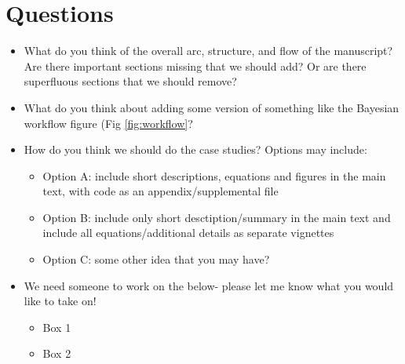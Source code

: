 \documentclass{article}
\begin{document}
\section* {Questions}
\begin{itemize}
\item What do you think of the overall arc, structure, and flow of the manuscript? Are there important sections missing that we should add? Or are there superfluous sections that we should remove?
\item What do you think about adding some version of something like the Bayesian workflow figure (Fig \ref{fig:workflow}? 
\item How do you think we should do the case studies? Options may include:
\begin {itemize}
\item Option A: include short descriptions, equations and figures in the main text, with code as an appendix/supplemental file
\item Option B: include only short desctiption/summary in the main text and include all equations/additional details as separate vignettes
\item Option C: some other idea that you may have?
\end{itemize}
\item We need someone to work on the below- please let me know what you would like to take on!
\begin {itemize}
\item Box 1
\item Box 2
\end{itemize}

\end{itemize}


\end{document}
